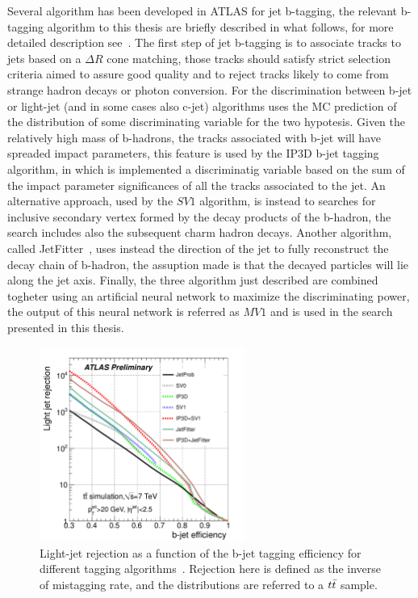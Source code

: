 Several algorithm has been developed in ATLAS for jet b-tagging, the relevant b-tagging algorithm
to this thesis are briefly described in what follows, for more detailed description see~\cite{AtlasCSCBook}.
The first step of jet b-tagging is to associate tracks to jets based on a $\Delta R$ cone matching, those tracks 
should satisfy strict selection criteria aimed to assure good quality 
and to reject tracks likely to come from strange hadron decays or photon conversion. 
For the discrimination between b-jet or light-jet (and in some cases also c-jet) 
algorithms uses the MC prediction of the distribution of some discriminating variable 
for the two hypotesis.
Given the relatively high mass of b-hadrons, the tracks
associated with b-jet will have spreaded impact parameters, this feature is used by the IP3D b-jet tagging 
algorithm, in which is implemented a discriminatig variable based on the sum of the impact parameter significances of all the tracks
associated to the jet. An alternative approach, used by the $SV1$ algorithm, is instead  to searches for inclusive 
secondary vertex formed by the decay products of the b-hadron,  the search includes also 
the subsequent charm hadron decays. Another algorithm, called JetFitter~\cite{jetfitter}, uses instead the direction of the jet
to fully reconstruct the decay chain of b-hadron, the assuption made is that the decayed particles will lie along the
jet axis. Finally, the three algorithm just described are combined togheter using an
artificial neural network to maximize the discriminating power, the output of this neural network is referred
as $MV1$ and is used in the search presented in this thesis. 

\begin{figure}[tp]
     \begin{center}

            \includegraphics[width=0.6\textwidth]{figure/obj/btag_perf.pdf}

    \end{center}
    \caption{Light-jet rejection as a function of the b-jet tagging efficiency for different tagging algorithms~\cite{btagPerf}.
	    Rejection here is defined as the inverse of mistagging rate, and the distributions are referred to a 
		$t\bar{t}$ sample.}
   \label{fig:beff}
\end{figure}

